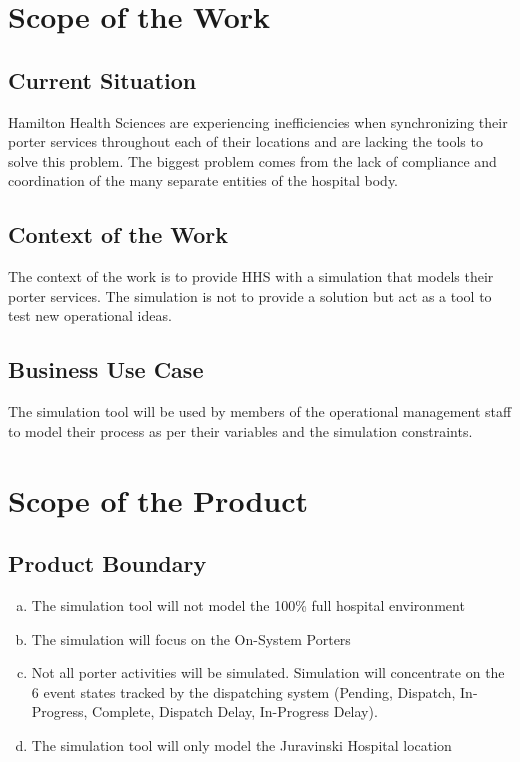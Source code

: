 \documentclass[paper=letter, fontsize=10pt]{scrartcl}
\numberwithin{equation}{section}		%
\numberwithin{figure}{section}			%
\numberwithin{table}{section}				%
\begin{document}
\section{Scope of the Work}
\subsection{Current Situation}
Hamilton Health Sciences are experiencing inefficiencies when synchronizing their porter services throughout each of their locations and are lacking the tools to solve this problem. The biggest problem comes from the lack of compliance and coordination of the many separate entities of the hospital body.
\subsection{Context of the Work}
The context of the work is to provide HHS with a simulation that models their porter services. The simulation is not to provide a solution but act as a tool to test new operational ideas.
\subsection{Business Use Case}
The simulation tool will be used by members of the operational management staff to model their process as per their variables and the simulation constraints.

\section{Scope of the Product}
\subsection{Product Boundary}
\begin{enumerate}[(a)]
	\item The simulation tool will not model the 100\% full hospital environment
	\item The simulation will focus on the On-System Porters
	\item Not all porter activities will be simulated. Simulation will concentrate on the 6 event states tracked by the dispatching system (Pending, Dispatch, In-Progress, Complete, Dispatch Delay, In-Progress Delay).
	\item The simulation tool will only model the Juravinski Hospital location  
\end{enumerate} 
\end{document}
